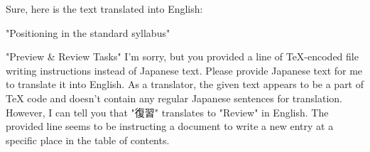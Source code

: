 Sure, here is the text translated into English:

"Positioning in the standard syllabus"

"Preview & Review Tasks"
I'm sorry, but you provided a line of TeX-encoded file writing instructions instead of Japanese text. Please provide Japanese text for me to translate it into English.
As a translator, the given text appears to be a part of TeX code and doesn't contain any regular Japanese sentences for translation. However, I can tell you that "復習" translates to "Review" in English. The provided line seems to be instructing a document to write a new entry at a specific place in the table of contents.

